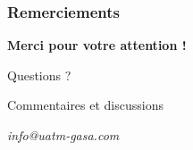 \documentclass[
	11pt,
	aspectratio=169,
]{beamer}
\begin{document}

\begin{frame}
	\frametitle{Remerciements}
	
		
	
	
	\centering
	\textbf{Merci pour votre attention !}
\end{frame}


\begin{frame}[plain]
	\begin{center}
		{\Huge Questions ?}
		
		\bigskip\bigskip
		
		{\LARGE Commentaires et discussions}
		
		\bigskip\bigskip
		
		\textit{info@uatm-gasa.com}
	\end{center}
\end{frame}

\end{document}

